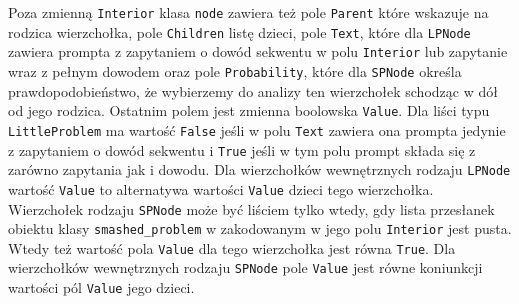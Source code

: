 \documentclass{article}
\begin{document}
Poza zmienną \texttt{Interior} klasa \texttt{node} zawiera też pole \texttt{Parent} które wskazuje na rodzica wierzchołka, pole \texttt{Children} listę dzieci, pole \texttt{Text}, które dla \texttt{LPNode} zawiera prompta z zapytaniem o dowód
sekwentu w polu \texttt{Interior} lub zapytanie wraz z pełnym dowodem oraz pole \texttt{Probability}, które dla \texttt{SPNode} określa prawdopodobieństwo, że wybierzemy do analizy ten wierzchołek schodząc w dół od jego rodzica. Ostatnim polem jest zmienna boolowska \texttt{Value}. Dla liści typu \texttt{LittleProblem} ma wartość \texttt{False} jeśli w polu \texttt{Text} zawiera ona prompta jedynie z zapytaniem o dowód sekwentu i \texttt{True} jeśli w tym polu
prompt składa się z zarówno zapytania jak i dowodu. Dla wierzchołków wewnętrznych rodzaju \texttt{LPNode} wartość \texttt{Value} to alternatywa wartości \texttt{Value} dzieci tego wierzchołka. Wierzchołek rodzaju \texttt{SPNode} może być liściem tylko wtedy, gdy lista przesłanek obiektu klasy \texttt{smashed\_problem} w zakodowanym w jego polu \texttt{Interior} jest pusta. Wtedy też wartość pola \texttt{Value} dla tego wierzchołka jest równa \texttt{True}. Dla wierzchołków wewnętrznych rodzaju \texttt{SPNode} pole \texttt{Value} jest równe koniunkcji wartości pól \texttt{Value} jego dzieci. 
\end{document}
